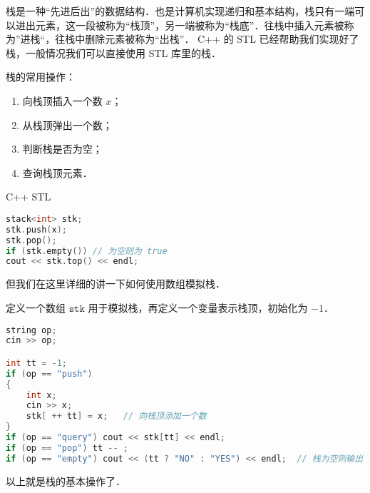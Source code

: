 
栈是一种“先进后出”的数据结构．也是计算机实现递归和基本结构，栈只有一端可以进出元素，这一段被称为“栈顶”，另一端被称为“栈底”．往栈中插入元素被称为”进栈“，往栈中删除元素被称为“出栈”．
C++ 的 STL 已经帮助我们实现好了栈，一般情况我们可以直接使用 STL 库里的栈．

栈的常用操作：
\begin{enumerate}
\item 向栈顶插入一个数 $x$；
\item 从栈顶弹出一个数；
\item 判断栈是否为空；
\item 查询栈顶元素．
\end{enumerate}

C++ STL
\begin{lstlisting}[language=cpp]
stack<int> stk;
stk.push(x);
stk.pop();
if (stk.empty()) // 为空则为 true
cout << stk.top() << endl;
\end{lstlisting}

但我们在这里详细的讲一下如何使用数组模拟栈．

定义一个数组 $\mathtt{stk}$ 用于模拟栈，再定义一个变量表示栈顶，初始化为 $-1$．

\begin{lstlisting}[language=cpp]
string op;
cin >> op;

int tt = -1;
if (op == "push")
{
    int x;
    cin >> x;
    stk[ ++ tt] = x;   // 向栈顶添加一个数
} 
if (op == "query") cout << stk[tt] << endl;
if (op == "pop") tt -- ;
if (op == "empty") cout << (tt ? "NO" : "YES") << endl;  // 栈为空则输出 NO，否则为 YES
\end{lstlisting}

以上就是栈的基本操作了．